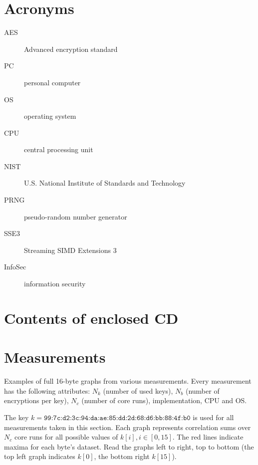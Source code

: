 \documentclass[thesis=B,english]{FITthesis}[2019/03/06]
\begin{document}
\printbibliography

\appendix

\chapter{Acronyms}
\begin{description}
	\item[AES] Advanced encryption standard
	\item[PC] personal computer
	\item[OS] operating system
	\item[CPU] central processing unit
	\item[NIST] U.S. National Institute of Standards and Technology
	\item[PRNG] pseudo-random number generator
	\item[SSE3] Streaming SIMD Extensions 3
	\item[InfoSec] information security
\end{description}

\chapter{Contents of enclosed CD}


\begin{figure}
\end{figure}

\chapter{Measurements}
\label{appendix:measurements}
Examples of full 16-byte graphs from various measurements.
Every measurement has the following attributes: $N_k$ (number of used keys), $N_b$ (number of encryptions per key), $N_c$ (number of core runs), implementation, CPU and OS.

The key $k = \texttt{99:7c:d2:3c:94:da:ae:85:dd:2d:68:d6:bb:88:4f:b0}$ is used for all measurements taken in this section.
Each graph represents correlation sums over $N_c$ core runs for all possible values of $k[i], i \in [0,15]$. The red lines indicate maxima for each byte's dataset.
Read the graphs left to right, top to bottom (the top left graph indicates $k[0]$, the bottom right $k[15]$).
\end{document}
